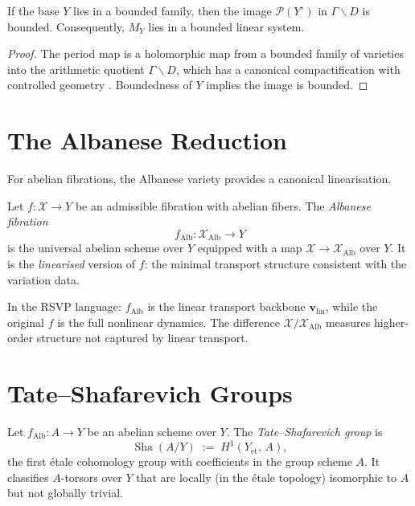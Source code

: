 \documentclass[11pt,openany]{book}
\newcommand{\Sha}{\operatorname{Sha}}
\begin{document}
\begin{proposition}
\label{prop:period-map-bounded}
If the base $Y$ lies in a bounded family, then the image
$\mathcal{P}(Y^\circ)$ in $\Gamma \backslash D$ is bounded.
Consequently, $M_Y$ lies in a bounded linear system.
\end{proposition}

\begin{proof}
The period map is a holomorphic map from a bounded family
of varieties into the arithmetic quotient $\Gamma \backslash
D$, which has a canonical compactification with controlled
geometry \citep{griffiths1968,schmid1973}.  Boundedness
of $Y$ implies the image is bounded.
\end{proof}

\section{The Albanese Reduction}
\label{sec:albanese}

For abelian fibrations, the Albanese variety provides a
canonical linearisation.

\begin{definition}
Let $f : \mathcal{X} \to Y$ be an admissible fibration
with abelian fibers.  The \emph{Albanese fibration}
\[
  f_{\mathrm{Alb}} : \mathcal{X}_{\mathrm{Alb}} \to Y
\]
is the universal abelian scheme over $Y$ equipped with a
map $\mathcal{X} \to \mathcal{X}_{\mathrm{Alb}}$ over $Y$.
It is the \emph{linearised} version of $f$: the minimal
transport structure consistent with the variation data.
\end{definition}

\begin{remark}
In the RSVP language: $f_{\mathrm{Alb}}$ is the linear
transport backbone $\boldsymbol{v}_{\mathrm{lin}}$, while
the original $f$ is the full nonlinear dynamics.  The
difference $\mathcal{X} / \mathcal{X}_{\mathrm{Alb}}$
measures higher-order structure not captured by linear
transport.
\end{remark}

\section{Tate--Shafarevich Groups}
\label{sec:ts-groups}

\begin{definition}
Let $f_{\mathrm{Alb}} : A \to Y$ be an abelian scheme
over $Y$.  The \emph{Tate--Shafarevich group} is
\[
  \Sha(A/Y) \;:=\; H^1(Y_{\mathrm{\acute{e}t}},\, A),
\]
the first étale cohomology group with coefficients in the
group scheme $A$.  It classifies $A$-torsors over $Y$
that are locally (in the étale topology) isomorphic to
$A$ but not globally trivial.
\end{definition}
\end{document}
